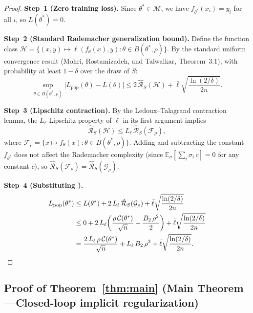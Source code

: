 \documentclass[11pt,a4paper]{article}
\theoremstyle{definition}
\theoremstyle{remark}
\newcommand{\E}{\mathbb{E}}
\newcommand{\cM}{\mathcal{M}}
\newcommand{\cC}{\mathcal{C}}
\newcommand{\cF}{\mathcal{F}}
\newcommand{\cG}{\mathcal{G}}
\newcommand{\cH}{\mathcal{H}}
\begin{document}
\begin{proof}
\textbf{Step~1 (Zero training loss).}\;
Since $\theta^* \in \cM$, we have $f_{\theta^*}(x_i) = y_i$ for all $i$,
so $L(\theta^*) = 0$.

\textbf{Step~2 (Standard Rademacher generalization bound).}\;
Define the function class
$\cH = \{(x,y) \mapsto \ell(f_\theta(x), y) : \theta \in B(\theta^*, \rho)\}$.
By the standard uniform convergence result (Mohri, Rostamizadeh, and Talwalkar,
Theorem~3.1), with probability at least $1 - \delta$ over the draw of $S$:
\[
  \sup_{\theta \in B(\theta^*, \rho)}
  \bigl|L_{\mathrm{pop}}(\theta) - L(\theta)\bigr|
  \leq 2\,\hat{\mathcal{R}}_S(\cH)
  + \bar{\ell}\sqrt{\frac{\ln(2/\delta)}{2n}}.
\]

\textbf{Step~3 (Lipschitz contraction).}\;
By the Ledoux--Talagrand contraction lemma, the $L_\ell$-Lipschitz property of
$\ell$ in its first argument implies
\[
  \hat{\mathcal{R}}_S(\cH) \leq L_\ell\,\hat{\mathcal{R}}_S(\cF_\rho),
\]
where $\cF_\rho = \{x \mapsto f_\theta(x) : \theta \in B(\theta^*, \rho)\}$.
Adding and subtracting the constant $f_{\theta^*}$ does not affect the Rademacher
complexity (since $\E_\sigma[\sum_i \sigma_i\, c] = 0$ for any constant $c$),
so $\hat{\mathcal{R}}_S(\cF_\rho) = \hat{\mathcal{R}}_S(\cG_\rho)$.

\textbf{Step~4 (Substituting ).}\;
\begin{align*}
  L_{\mathrm{pop}}(\theta^*)
  &\leq L(\theta^*)
  + 2\,L_\ell\,\hat{\mathcal{R}}_S(\cG_\rho)
  + \bar{\ell}\sqrt{\frac{\ln(2/\delta)}{2n}} \\
  &\leq 0
  + 2\,L_\ell\!\left(
    \frac{\rho\,\cC(\theta^*)}{\sqrt{n}} + \frac{B_2\,\rho^2}{2}
  \right)
  + \bar{\ell}\sqrt{\frac{\ln(2/\delta)}{2n}} \\
  &= \frac{2\,L_\ell\,\rho\,\cC(\theta^*)}{\sqrt{n}}
  + L_\ell\, B_2\,\rho^2
  + \bar{\ell}\sqrt{\frac{\ln(2/\delta)}{2n}}.
  \qedhere
\end{align*}
\end{proof}

\subsection{Proof of Theorem~\ref{thm:main} (Main Theorem---Closed-loop implicit regularization)}
\end{document}
